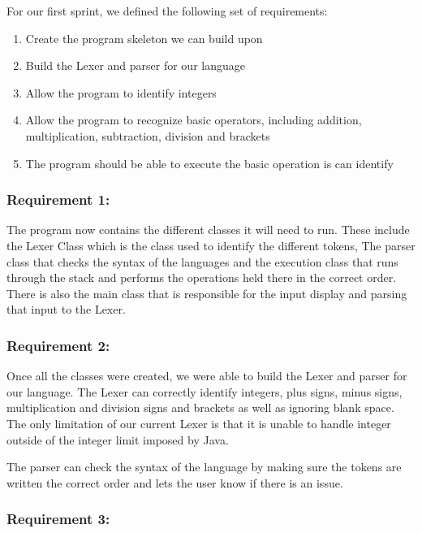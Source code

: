 \documentclass[a4paper, oneside, 11pt]{report}
\begin{document}
For our first sprint, we defined the following set of requirements: 

\begin{enumerate}
\item Create the program skeleton we can build upon 
\item Build the Lexer and parser for our language 
\item Allow the program to identify integers 
\item Allow the program to recognize basic operators, including addition, multiplication, subtraction, division and brackets 
\item The program should be able to execute the basic operation is can identify 
\end{enumerate}

\subsubsection{Requirement 1: }

The program now contains the different classes it will need to run. These include the Lexer Class which is the class used to identify the different tokens, The parser class that checks the syntax of the languages and the execution class that runs through the stack and performs the operations held there in the correct order. There is also the main class that is responsible for the input display and parsing that input to the Lexer. 

\subsubsection{Requirement 2: }

Once all the classes were created, we were able to build the Lexer and parser for our language. The Lexer can correctly identify integers, plus signs, minus signs, multiplication and division signs and brackets as well as ignoring blank space. The only limitation of our current Lexer is that it is unable to handle integer outside of the integer limit imposed by Java. 

The parser can check the syntax of the language by making sure the tokens are written the correct order and lets the user know if there is an issue. 

\subsubsection{Requirement 3: }
\end{document}
